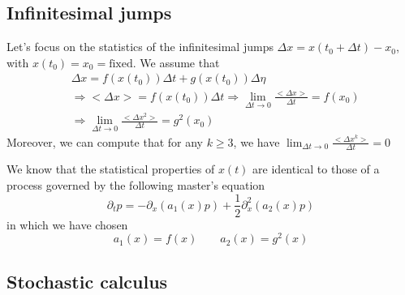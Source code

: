 \documentclass[a4paper]{book}
\theoremstyle{definition}
\theoremstyle{remark}
\begin{document}
\subsection{Infinitesimal jumps}
Let's focus on the statistics of the infinitesimal jumps $\Delta x = x(t_0 + \Delta t) - x_0$, with $x(t_0) = x_0 = \text{fixed}$. We assume that 
\begin{equation}
    \begin{aligned}
        &\Delta x = f(x(t_0))\Delta t + g(x(t_0))\Delta \eta \\
        &\Rightarrow <\Delta x> = f(x(t_0)) \Delta t \Rightarrow \lim_{\Delta t \rightarrow 0} \frac{<\Delta x>}{\Delta t} = f(x_0) \\ 
        &\Rightarrow \lim_{\Delta t \rightarrow 0} \frac{<\Delta x^2>}{\Delta t} = g^2(x_0)
    \end{aligned}
\end{equation}
Moreover, we can compute that for any $k\geq 3$, we have $ \lim_{\Delta t \rightarrow 0} \frac{<\Delta x^k>}{\Delta t} = 0$ \par \medskip

We know that the statistical properties of $x(t)$ are identical to those of a process governed by the following master's equation 
\begin{equation}
    \partial_t p = -\partial_x (a_1 (x)p ) + \frac{1}{2}\partial^2_x (a_2(x)p)
\end{equation}
in which we have chosen 
\begin{equation}
    a_1(x) = f(x) \qquad a_2(x) = g^2(x)
\end{equation}

\subsection{Stochastic calculus}
\end{document}
